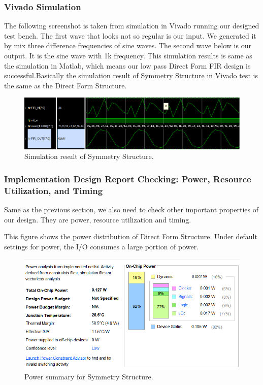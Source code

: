 \documentclass[a4paper]{article}
\begin{document}
\subsubsection{Vivado Simulation}
The following screenshot is taken from simulation in Vivado running our designed test bench. The first wave that looks not so regular is our input. We generated it by mix three difference frequencies of sine waves. The second wave below is our output. It is the sine wave with 1k frequency. This simulation results is same as the simulation in Matlab, which means our low pass Direct Form FIR design is successful.Basically the simulation result of Symmetry Structure in Vivado test is the same as the Direct Form Structure.
\begin{figure}[H]
    \centering
    \includegraphics[width=1\textwidth]{siyuan/Sym simulation.png}
    \caption{Simulation result of Symmetry Structure.}
\end{figure}

\subsubsection{Implementation Design Report Checking: Power, Resource Utilization, and Timing}
Same as the previous section, we also need to check other important properties of our design. They are power, resource utilization and timing.

This figure shows the power distribution of Direct Form Structure. Under default settings for power, the I/O consumes a large portion of power. 
\begin{figure}[H]
    \centering
    \includegraphics[width=1\textwidth]{siyuan/Sym power.png}
    \caption{Power summary for Symmetry Structure.}
\end{figure}
\end{document}
